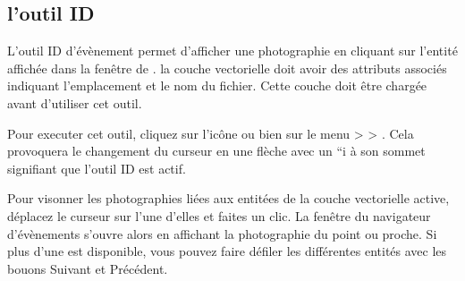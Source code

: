 \subsection{l'outil ID}\label{evis_id_tool}

L'outil ID d'évènement permet d'afficher une photographie en cliquant sur l'entité affichée dans la fenêtre de \qg. la couche vectorielle doit avoir des attributs associés indiquant l'emplacement et le nom du fichier. Cette couche doit être chargée avant d'utiliser cet outil.

\label{evis_launch_id}


Pour executer cet outil, cliquez sur l'icône  ou bien sur le menu  >  > . Cela provoquera le changement du curseur en une flèche avec un ``i   à son sommet signifiant que l'outil ID est actif.


Pour visonner les photographies liées aux entitées de la couche vectorielle active, déplacez le curseur sur l'une d'elles et faites un clic. La fenêtre du navigateur d'évènements s'ouvre alors en affichant la photographie du point ou proche. Si plus d'une est disponible, vous pouvez faire défiler les différentes entités avec les bouons Suivant et Précédent.


